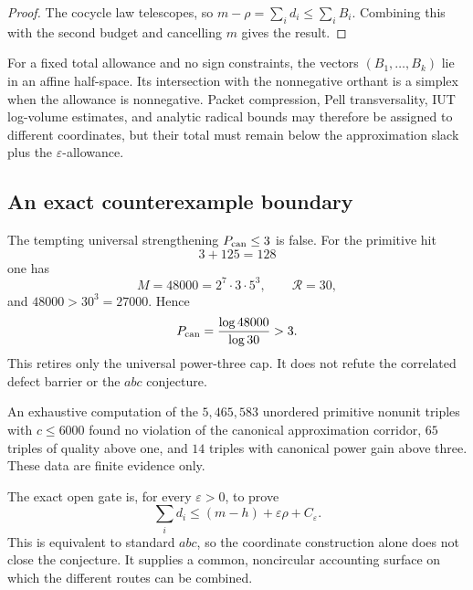 \begin{proof}
The cocycle law telescopes, so
$m-\rho=\sum_i d_i\le\sum_iB_i$.  Combining this with the second budget and
cancelling $m$ gives the result.
\end{proof}

For a fixed total allowance and no sign constraints, the vectors
$(B_1,\ldots,B_k)$ lie in an affine half-space.  Its intersection with the
nonnegative orthant is a simplex when the allowance is nonnegative.  Packet
compression, Pell transversality, IUT log-volume estimates, and analytic
radical bounds may therefore be assigned to different coordinates, but their
total must remain below the approximation slack plus the
$\varepsilon$-allowance.

\subsection{An exact counterexample boundary}

The tempting universal strengthening $P_{\rm can}\le3$ is false.  For the
primitive hit
\[
 3+125=128
\]
one has
\[
 M=48000=2^7\cdot3\cdot5^3,
 \qquad \mathcal R=30,
\]
and $48000>30^3=27000$.  Hence
\[
 P_{\rm can}=\frac{\log48000}{\log30}>3.
\]
This retires only the universal power-three cap.  It does not refute the
correlated defect barrier or the $abc$ conjecture.

An exhaustive computation of the $5{,}465{,}583$ unordered primitive
nonunit triples with $c\le6000$ found no violation of the canonical
approximation corridor, $65$ triples of quality above one, and $14$ triples
with canonical power gain above three.  These data are finite evidence only.

The exact open gate is, for every $\varepsilon>0$, to prove
\[
 \sum_i d_i\le(m-h)+\varepsilon \rho+C_\varepsilon.
\]
This is equivalent to standard $abc$, so the coordinate construction alone
does not close the conjecture.  It supplies a common, noncircular accounting
surface on which the different routes can be combined.
